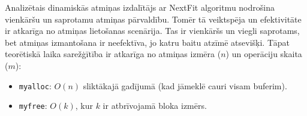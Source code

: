 \documentclass{article}
\begin{document}
	Analizētais dinamiskās atmiņas izdalītājs ar NextFit algoritmu nodrošina vienkāršu un saprotamu atmiņas pārvaldību. Tomēr tā veiktspēja un efektivitāte ir atkarīga no atmiņas lietošanas scenārija. Tas ir vienkāršs un viegli saprotams, bet atmiņas izmantošana ir neefektīva, jo katru baitu atzīmē atsevišķi. Tāpat teorētiskā laika sarežģītība ir atkarīga no atmiņas izmēra ($n$) un operāciju skaita ($m$):
	\begin{itemize}
		\item \texttt{myalloc}: $O(n)$ sliktākajā gadījumā (kad jāmeklē cauri visam buferim).
		\item \texttt{myfree}: $O(k)$, kur $k$ ir atbrīvojamā bloka izmērs.
	\end{itemize}
\end{document}
